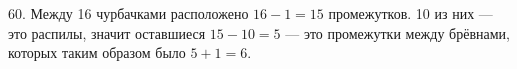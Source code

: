 60. Между 16 чурбачками расположено $16-1=15$ промежутков. 10 из них --- это распилы, значит оставшиеся $15-10=5$ --- это промежутки между брёвнами, которых таким образом было $5+1=6.$\\
